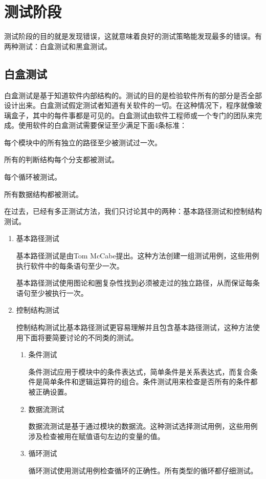 \section{测试阶段}
测试阶段的目的就是发现错误，这就意味着良好的测试策略能发现最多的错误。有两种测试：白盒测试和黑盒测试。
\subsection{白盒测试}
白盒测试是基于知道软件内部结构的。测试的目的是检验软件所有的部分是否全部设计出来。白盒测试假定测试者知道有关软件的一切。在这种情况下，程序就像玻璃盒子，其中的每件事都是可见的。白盒测试由软件工程师或一个专门的团队来完成。使用软件的白盒测试需要保证至少满足下面4条标准：

每个模块中的所有独立的路径至少被测试过一次。

所有的判断结构每个分支都被测试。

每个循环被测试。

所有数据结构都被测试。

在过去，已经有多正测试方法，我们只讨论其中的两种：基本路径测试和控制结构测试。
\begin{enumerate}
	\item 基本路径测试

	基本路径测试是由Tom McCabe提出。这种方法创建一组测试用例，这些用例执行软件中的每条语句至少一次。

	基本路径测试使用图论和圈复杂性找到必须被走过的独立路径，从而保证每条语句至少被执行一次。
	\item 控制结构测试

	控制结构测试比基本路径测试更容易理解并且包含基本路径测试，这种方法使用下面将要简要讨论的不同类的测试。
	\begin{enumerate}
		\item 条件测试

		条件测试应用于模块中的条件表达式，简单条件是关系表达式，而复合条件是简单条件和逻辑运算符的组合。条件测试用来检查是否所有的条件都被正确设置。
		\item 数据流测试

		数据流测试是基于通过模块的数据流。这种测试选择测试用例，这些用例涉及检查被用在赋值语句左边的变量的值。
		\item 循环测试

		循环测试使用测试用例检查循环的正确性。所有类型的循环都仔细测试。
	\end{enumerate}
\end{enumerate}
